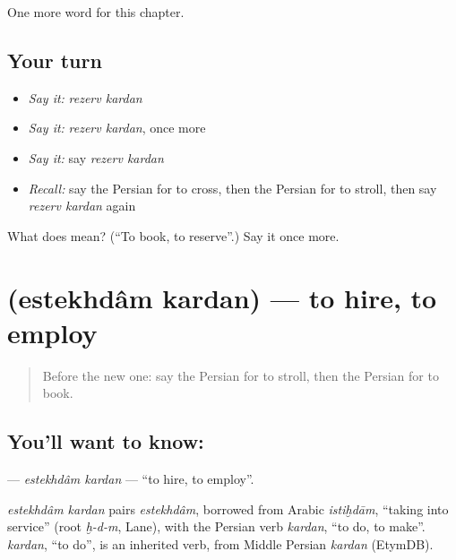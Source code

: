 \begin{grammarlens}[title={What you've built}]
One more word for this chapter.
\end{grammarlens}

\subsection*{Your turn}
\begin{itemize}
\raggedright
  \item \emph{Say it:} \emph{rezerv kardan}
  \item \emph{Say it:} \emph{rezerv kardan}, once more
  \item \emph{Say it:} say \emph{rezerv kardan}
  \item \emph{Recall:} say the Persian for to cross, then the Persian for to stroll, then say \emph{rezerv kardan} again
\end{itemize}

\begin{tcolorbox}[breakable,colback=teal!4,colframe=teal!35!black,title={Before you move on}]
What does   mean? (\textquotedblleft{}To book, to reserve\textquotedblright{}.) Say it once more.
\end{tcolorbox}
\section[\texorpdfstring{\fa{استخدام} \fa{کردن} (estekhdâm kardan)}{استخدام کردن (estekhdâm kardan)}]{  (estekhdâm kardan) — to hire, to employ}

\label{lesson:FA-C182-estekhdam-kardan}



\begin{quote}
Before the new one: say the Persian for to stroll, then the Persian for to book.
\end{quote}

\subsection*{You'll want to know:  }
\textbf{ } — \emph{estekhdâm kardan} — \textquotedblleft{}to hire, to employ\textquotedblright{}.

\begin{cousinweb}
\emph{estekhdâm kardan} pairs \emph{estekhdâm}, borrowed from Arabic \emph{istiḫdām}, \textquotedblleft{}taking into service\textquotedblright{} (root \emph{ḫ-d-m}, Lane), with the Persian verb \emph{kardan}, \textquotedblleft{}to do, to make\textquotedblright{}. \emph{kardan}, \textquotedblleft{}to do\textquotedblright{}, is an inherited verb, from Middle Persian \emph{kardan} (EtymDB).
\end{cousinweb}

